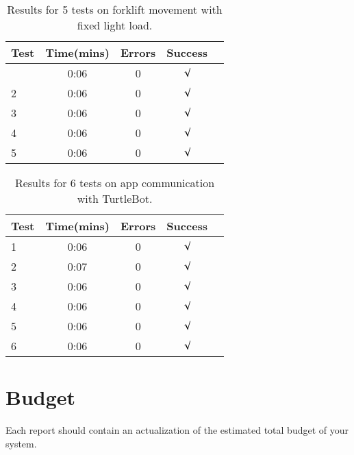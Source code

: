 \documentclass{article}
\begin{document}
\begin{table}[h]
    \vskip 3mm
    \begin{center}
    \begin{small}
    \begin{sc}
    \begin{tabular}{lcccr}
    \hline
    \abovespace\belowspace
    Test  & Time(mins) & Errors & Success \\
    \hline
    \abovespace
    1    & 0:06 & 0 & $\surd$ \\
    2    & 0:06 & 0 & $\surd$\\
    3    & 0:06 & 0 & $\surd$ \\
    4    & 0:06 & 0 & $\surd$\\
    5    & 0:06 & 0 & $\surd$ \\
    \hline
    \end{tabular}
    \end{sc}
    \end{small}
    \caption{Results for 5 tests on forklift movement with fixed light load.}
    \label{tab:sample-table}
    \end{center}
    \vskip -3mm
\end{table}

\begin{table}[h]
    \vskip 3mm
    \begin{center}
    \begin{small}
    \begin{sc}
    \begin{tabular}{lcccr}
    \hline
    \abovespace\belowspace
    Test  & Time(mins) & Errors & Success \\
    \hline
    1    & 0:06 & 0 & $\surd$ \\
    2    & 0:07 & 0 & $\surd$\\
    3    & 0:06 & 0 & $\surd$ \\
    4    & 0:06 & 0 & $\surd$\\
    5    & 0:06 & 0 & $\surd$\\
    6    & 0:06 & 0 & $\surd$ \\
    \hline
    \end{tabular}
    \end{sc}
    \end{small}
    \caption{Results for 6 tests on app communication with TurtleBot.}
    \label{tab:sample-table}
    \end{center}
    \vskip -3mm
\end{table}

\section{Budget}
Each report should contain an actualization of the estimated total budget 
of your system.
\end{document}

